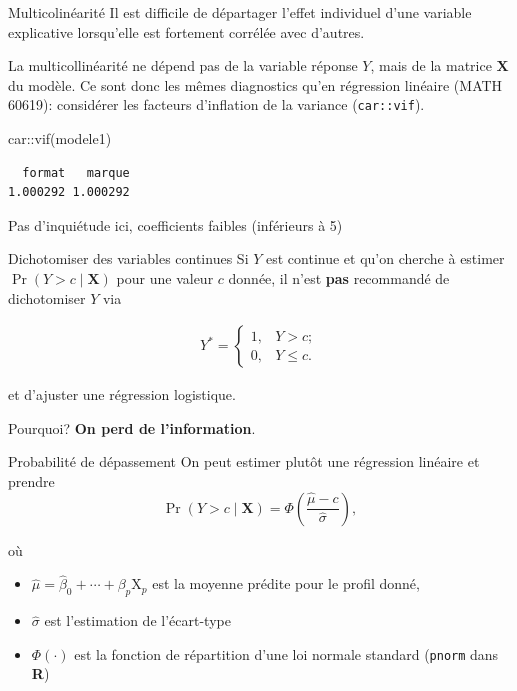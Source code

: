 \documentclass[
  ignorenonframetext,
]{beamer}
\newenvironment{Shaded}{\begin{snugshade}}{\end{snugshade}}
\newcommand{\FunctionTok}[1]{\textcolor[rgb]{0.28,0.35,0.67}{#1}}
\newcommand{\NormalTok}[1]{\textcolor[rgb]{0.00,0.23,0.31}{#1}}
\newcommand{\SpecialCharTok}[1]{\textcolor[rgb]{0.37,0.37,0.37}{#1}}
\providecommand{\tightlist}{%
  \setlength{\itemsep}{0pt}\setlength{\parskip}{0pt}}
\begin{document}
\begin{frame}[fragile]{Multicolinéarité}
\protect{}\label{multicolinuxe9arituxe9}
Il est difficile de départager l'effet individuel d'une variable
explicative lorsqu'elle est fortement corrélée avec d'autres.

La multicollinéarité ne dépend pas de la variable réponse \(Y\), mais de
la matrice \(\mathbf{X}\) du modèle. Ce sont donc les mêmes diagnostics
qu'en régression linéaire (MATH 60619): considérer les facteurs
d'inflation de la variance (\texttt{car::vif}).

\begin{Shaded}
\begin{Highlighting}[numbers=left,,]
\NormalTok{car}\SpecialCharTok{::}\FunctionTok{vif}\NormalTok{(modele1)}
\end{Highlighting}
\end{Shaded}

\begin{verbatim}
  format   marque 
1.000292 1.000292 
\end{verbatim}

Pas d'inquiétude ici, coefficients faibles (inférieurs à 5)
\end{frame}

\begin{frame}{Dichotomiser des variables continues}
\protect{}\label{dichotomiser-des-variables-continues}
Si \(Y\) est continue et qu'on cherche à estimer
\(\Pr(Y> c \mid \mathbf{X})\) pour une valeur \(c\) donnée, il n'est
\textbf{pas} recommandé de dichotomiser \(Y\) via

\begin{align*}
Y^{*} = \begin{cases}
1, & Y > c; \\
0, & Y \leq c.
\end{cases}
\end{align*}

et d'ajuster une régression logistique.

Pourquoi? \textbf{On perd de l'information}.
\end{frame}

\begin{frame}[fragile]{Probabilité de dépassement}
\protect{}\label{probabilituxe9-de-duxe9passement}
On peut estimer plutôt une régression linéaire et prendre
\[\Pr(Y > c \mid \mathbf{X}) = \Phi\left(\frac{\widehat{\mu}-c}{\widehat{\sigma}}\right),\]

où

\begin{itemize}
\tightlist
\item
  \(\widehat{\mu}=\widehat{\beta}_0 +  \cdots + \beta_p\mathrm{X}_p\)
  est la moyenne prédite pour le profil donné,
\item
  \(\widehat{\sigma}\) est l'estimation de l'écart-type
\item
  \(\Phi(\cdot)\) est la fonction de répartition d'une loi normale
  standard (\texttt{pnorm} dans \textbf{R})
\end{itemize}
\end{frame}
\end{document}
